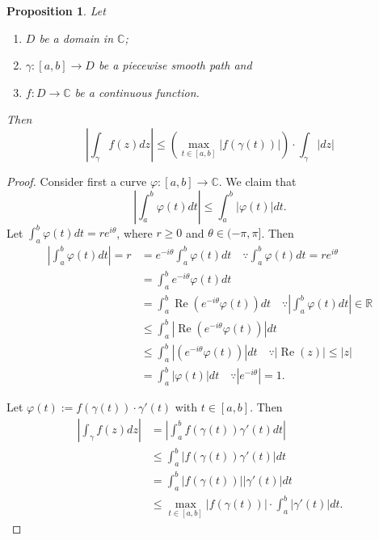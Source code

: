 \documentclass[12pt,openany]{book}
\newtheorem{proposition}[theorem]{Proposition}
\theoremstyle{definition}
\newcommand{\R}{\mathbb{R}}
\newcommand{\C}{\mathbb{C}}
\newcommand{\of}[1]{\left( #1 \right)}
\newcommand{\abs}[1]{\left\lvert #1 \right\rvert}
\renewcommand{\Re}{\operatorname{Re}}
\begin{document}
	\vspace{8pt}
	\begin{tcolorbox}[colback=white,colframe=procolor,arc=5pt,title={\color{white}\bf }]
		\begin{proposition}
			Let \begin{enumerate}
				\item $D$ be a domain in $\C$;
				\item $\gamma:[a,b]\to D$ be a piecewise smooth path and
				\item $f:D\to\C$ be a continuous function.
			\end{enumerate} Then \[
			\abs{\int_\gamma f\of{z}dz}\leq\of{\max_{t\in[a,b]}\abs{f\of{\gamma\of{t}}}}\cdot\int_\gamma\abs{dz}
			\]
		\end{proposition}
	\end{tcolorbox}
	\begin{proof}
		Consider first a curve $\varphi:[a,b]\to\C$. We claim that \[
		\abs{\int_a^b\varphi\of{t}dt}\leq\int_a^b\abs{\varphi\of{t}}dt.
		\] Let $\displaystyle\int_a^b\varphi\of{t}dt=re^{i\theta}$, where $r\geq 0$ and $\theta\in(-\pi,\pi]$. Then \begin{align*}
			\abs{\int_a^b\varphi\of{t}dt}=r
			&=e^{-i\theta}\int_a^b\varphi\of{t}dt\quad\because\int_a^b\varphi\of{t}dt=re^{i\theta}\\
			&=\int_a^be^{-i\theta}\varphi\of{t}dt\\
			&=\int_a^b\Re\of{e^{-i\theta}\varphi\of{t}}dt\quad\because\abs{\int_a^b\varphi\of{t}dt}\in\R\\
			&\leq\int_a^b\abs{\Re\of{e^{-i\theta}\varphi\of{t}}}dt \\
			&\leq\int_a^b\abs{\of{e^{-i\theta}\varphi\of{t}}}dt\quad\because\abs{\Re\of{z}}\leq\abs{z}\\
			&=\int_a^b\abs{\varphi\of{t}}dt\quad\because \abs{e^{-i\theta}}=1.
		\end{align*}
		
		Let $\varphi\of{t}:=f\of{\gamma\of{t}}\cdot\gamma'\of{t}$ with $t\in[a,b]$. Then
		\begin{align*}
			\abs{\int_\gamma f\of{z}dz}&=\abs{\int_a^b f\of{\gamma\of{t}}\gamma'\of{t}dt}\\
			&\leq{\int_a^b \abs{f\of{\gamma\of{t}}\gamma'\of{t}}dt}\\
			&=\int_a^b\abs{f\of{\gamma\of{t}}}\abs{\gamma'\of{t}}dt\\
			&\leq\max_{t\in[a,b]}\abs{f\of{\gamma\of{t}}}\cdot\int_a^b\abs{\gamma'\of{t}}dt.
		\end{align*}
	\end{proof}
	
\end{document}

